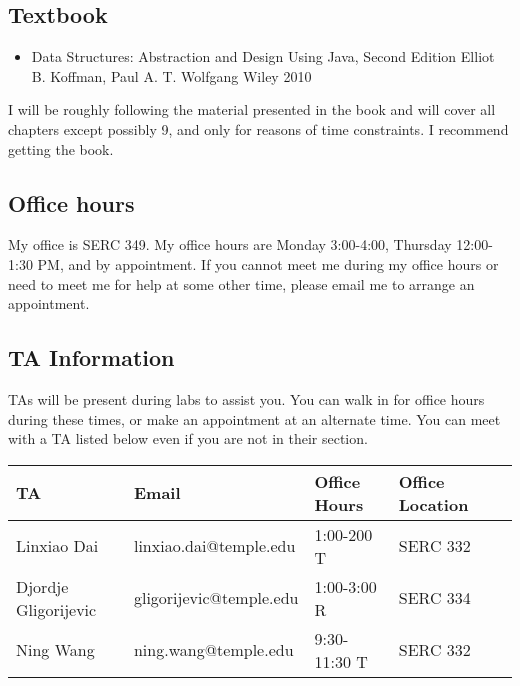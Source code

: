 \documentclass[10pt, letter]{article}
\begin{document}
\subsection*{Textbook}
\begin{itemize}
	\item Data Structures: Abstraction and Design Using Java, Second Edition Elliot B. Koffman, Paul A. T. Wolfgang Wiley 2010
\end{itemize}

I will be roughly following the material presented in the book and will cover all chapters except possibly 9, and only for reasons of time constraints.
I recommend getting the book.

\subsection*{Office hours}
My office is SERC 349.
My office hours are Monday 3:00-4:00, Thursday 12:00-1:30 PM, and by appointment.
If you cannot meet me during my office hours or need to meet me for help at some other time, please email me to arrange an appointment. 

\subsection*{TA Information}

TAs will be present during labs to assist you.
You can walk in for office hours during these times, or make an appointment at an alternate time.
You can meet with a TA listed below even if you are not in their section.

{\footnotesize
	\begin{tabular}{l l l l l}
		TA & Email &Office Hours & Office Location \\ \hline
		Linxiao Dai & linxiao.dai@temple.edu & 1:00-200 T & SERC 332 \\
		Djordje Gligorijevic & gligorijevic@temple.edu & 1:00-3:00 R & SERC 334\\
		Ning Wang & ning.wang@temple.edu & 9:30-11:30 T & SERC 332\\
	\end{tabular}
}





\end{document}

